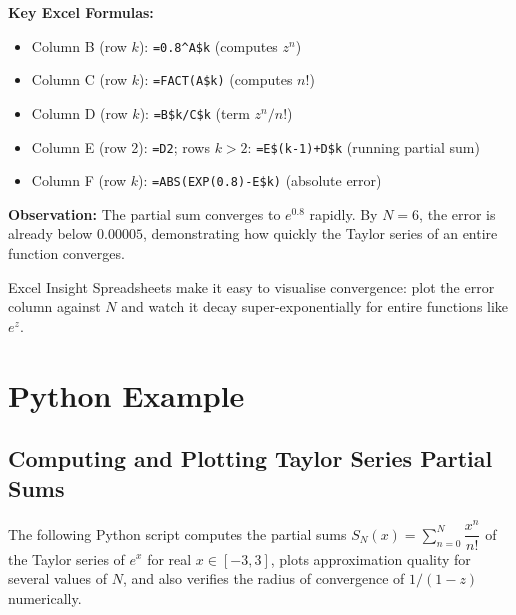 \documentclass[12pt,a4paper]{article}
\begin{document}
\medskip
\noindent\textbf{Key Excel Formulas:}
\begin{itemize}[noitemsep]
  \item Column B (row $k$): \texttt{=0.8\^{}A\$k} \quad (computes $z^n$)
  \item Column C (row $k$): \texttt{=FACT(A\$k)} \quad (computes $n!$)
  \item Column D (row $k$): \texttt{=B\$k/C\$k} \quad (term $z^n/n!$)
  \item Column E (row 2): \texttt{=D2}; rows $k>2$: \texttt{=E\$(k-1)+D\$k} \quad (running partial sum)
  \item Column F (row $k$): \texttt{=ABS(EXP(0.8)-E\$k)} \quad (absolute error)
\end{itemize}

\noindent\textbf{Observation:} The partial sum converges to $e^{0.8}$ rapidly. By $N=6$, the error is already below $0.00005$, demonstrating how quickly the Taylor series of an entire function converges.

\begin{learnbox}{Excel Insight}
Spreadsheets make it easy to visualise convergence: plot the error column against $N$ and watch it decay super-exponentially for entire functions like $e^z$.
\end{learnbox}

\section{Python Example}

\subsection*{Computing and Plotting Taylor Series Partial Sums}

The following Python script computes the partial sums $S_N(x) = \sum_{n=0}^{N}\dfrac{x^n}{n!}$ of the Taylor series of $e^x$ for real $x \in [-3, 3]$, plots approximation quality for several values of $N$, and also verifies the radius of convergence of $1/(1-z)$ numerically.
\end{document}
